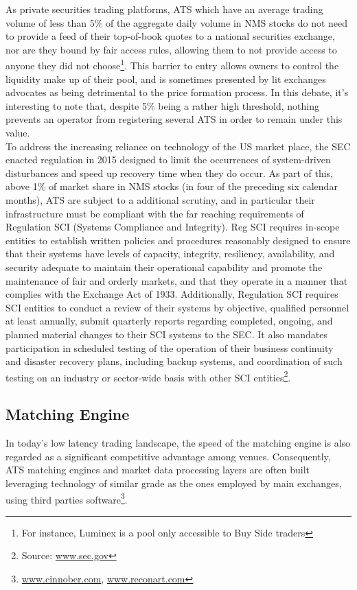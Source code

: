 As private securities trading platforms, ATS which have an average trading volume of less than 5\% of the aggregate daily volume in NMS stocks do not need to provide a feed of their top-of-book quotes to a national securities exchange, nor are they bound by fair access rules, allowing them to not provide access to anyone they did not choose\footnote{For instance, Luminex is a pool only accessible to Buy Side traders}. This barrier to entry allows owners to control the liquidity make up of their pool, and is sometimes presented by lit exchanges advocates as being detrimental to the price formation process. In this debate, it's interesting to note that, despite 5\% being a rather high threshold, nothing prevents an operator from registering several ATS in order to remain under this value.\\

To address the increasing reliance on technology of the US market place, the SEC enacted regulation in 2015 designed to limit the occurrences of system-driven disturbances and speed up recovery time when they do occur. As part of this, above 1\% of market share in NMS stocks (in four of the preceding six calendar months), ATS are subject to a additional scrutiny, and in particular their infrastructure must be compliant with the far reaching requirements of Regulation SCI (Systems Compliance and Integrity). Reg SCI requires in-scope entities to establish written policies and procedures reasonably designed to ensure that their systems have levels of capacity, integrity, resiliency, availability, and security adequate to maintain their operational capability and promote the maintenance of fair and orderly markets, and that they operate in a manner that complies with the Exchange Act of 1933. Additionally, Regulation SCI requires SCI entities to conduct a review of their systems by objective, qualified personnel at least annually, submit quarterly reports regarding completed, ongoing, and planned material changes to their SCI systems to the SEC. It also mandates participation in scheduled testing of the operation of their business continuity and disaster recovery plans, including backup systems, and coordination of such testing on an industry or sector-wide basis with other SCI entities\footnote{Source: \url{www.sec.gov}}.


\subsection{Matching Engine}

In today's low latency trading landscape, the speed of the matching engine is also regarded as a significant competitive advantage among venues. Consequently, ATS  matching engines and market data processing layers are often built leveraging technology of similar grade as the ones employed by main exchanges, using third parties software\footnote{\url{www.cinnober.com}, \url{www.reconart.com}}. 

